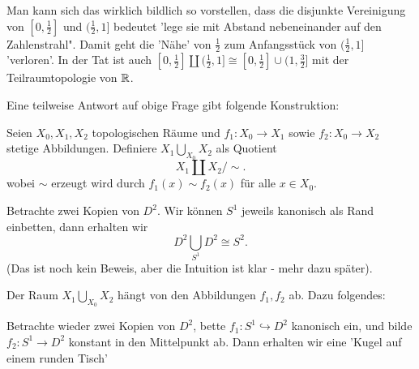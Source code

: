 \begin{remark*}
    Man kann sich das wirklich bildlich so vorstellen, dass die disjunkte Vereinigung von $[0,\frac{1}{2}]$ und $(\frac{1}{2},1]$ bedeutet 'lege sie mit Abstand nebeneinander auf den Zahlenstrahl". Damit geht die 'Nähe' von $\frac{1}{2}$ zum Anfangsstück von $(\frac{1}{2},1]$ 'verloren'. In der Tat ist auch $[0,\frac{1}{2}] \coprod (\frac{1}{2},1] \cong [0,\frac{1}{2}] \cup (1,\frac{3}{2}]$ mit der Teilraumtopologie von $\mathbb{R}$.
\end{remark*}
Eine teilweise Antwort auf obige Frage gibt folgende Konstruktion:
\begin{definition}\label{def:koprodukt-über-basisraum}
    Seien $X_0,X_1,X_2$ topologischen Räume und $f_1: X_0 \to  X_1$ sowie $f_2 : X_0 \to X_2$ stetige Abbildungen. Definiere $X_1 \bigcup\limits_{X_0} X_2$ als Quotient 
    \[
    X_1 \coprod X_2 / \sim 
    .\] 
    wobei $\sim $ erzeugt wird durch $f_1(x) \sim f_2(x)$ für alle $x\in X_0$.
\end{definition}
\begin{example}
    Betrachte zwei Kopien von $D^2$. Wir können $S^1$ jeweils kanonisch als Rand einbetten, dann erhalten wir
     \[
    D^2 \bigcup_{S^1}D^2 \cong S^2 
    .\] 
    (Das ist noch kein Beweis, aber die Intuition ist klar - mehr dazu später).
\end{example}
\begin{warning}
    Der Raum $X_1\bigcup\limits_{X_0} X_2$ hängt von den Abbildungen $f_1,f_2$ ab. Dazu folgendes:
\end{warning}
\begin{example}
    Betrachte wieder zwei Kopien von $D^2$, bette $f_1: S^1 \hookrightarrow  D^2$ kanonisch ein, und bilde $f_2: S^1 \to  D^2$ konstant in den Mittelpunkt ab. Dann erhalten wir eine 'Kugel auf einem runden Tisch'
\end{example}

